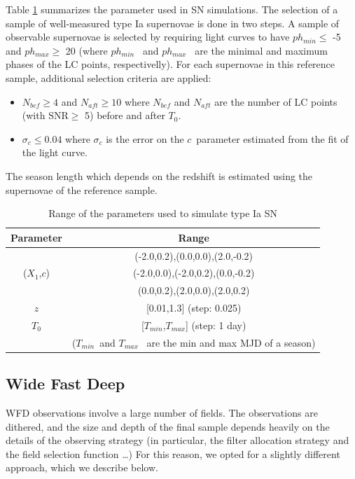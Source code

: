\documentclass [11pt,a4paper]{article}
\newcommand{\strech}{$X_1$}
\newcommand{\sncolor}{$c$}
\newcommand{\daymax}{$T_0$}
\newcommand{\redshift}{$z$}
\newcommand{\tmin}{$T_{min}$}
\newcommand{\tmax}{$T_{max}$}
\newcommand{\phasemin}{$ph_{min}$}
\newcommand{\phasemax}{$ph_{max}$}
\begin{document}
Table \ref{tab:sim_ddf} summarizes the parameter used in SN simulations. The selection of a sample of well-measured type Ia supernovae is done in two steps. A sample of observable supernovae is selected by requiring light curves to have \phasemin $\leq$ -5 and \phasemax $\geq$ 20 (where \phasemin~ and \phasemax~ are the minimal and maximum phases of the LC points, respectivelly). For each supernovae in this reference sample, additional selection criteria are applied:
\begin{itemize}
\item $N_{bef} \geq 4$ and $N_{aft} \geq 10$ where $N_{bef}$ and $N_{aft}$ are the number of LC points (with SNR$\geq$ 5) before and after \daymax.
 \item $\sigma_c \leq 0.04$ where $\sigma_c$ is the error on the \sncolor~parameter estimated from the fit of the light curve.
\end{itemize}
The season length which depends on the redshift is estimated using the supernovae of the reference sample.

\begin{table}[!htbp]
\begin{center}
\begin{tabular}{|c|c|}
\hline
Parameter & Range \\
\hline
                    & (-2.0,0.2),(0.0,0.0),(2.0,-0.2) \\
 (\strech,\sncolor) & (-2.0,0.0),(-2.0,0.2),(0.0,-0.2) \\
                    & (0.0,0.2),(2.0,0.0),(2.0,0.2) \\
\hline
\redshift           & [0.01,1.3] (step: 0.025) \\
\hline
\daymax             & [\tmin,\tmax] (step: 1 day) \\
                    & (\tmin~and \tmax~ are the min and max MJD of a season) \\
                    \hline
\end{tabular}
\caption{Range of the parameters used to simulate type Ia SN}\label{tab:sim_ddf}
\end{center}
\end{table}


\subsection{Wide Fast Deep}
WFD observations involve a large number of fields.  The observations
are dithered, and the size and depth of the final sample depends
heavily on the details of the observing strategy (in particular, the
filter allocation strategy and the field selection function \ldots)
For this reason, we opted for a slightly different approach, which we
describe below.
\end{document}
